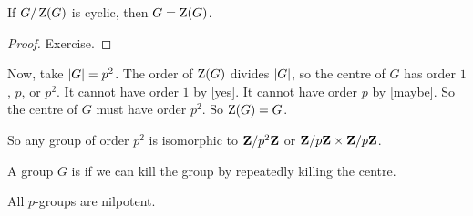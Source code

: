 \documentclass[11pt, oneside]{amsart}
\begin{document}
\begin{proposition}\label{maybe}
If $G/\operatorname{Z}(G)$ is cyclic, then $G=\operatorname{Z}(G)$.
\end{proposition}
\begin{proof}
Exercise.
\end{proof}

Now, take $\left \lvert G \right \rvert = p^2$. The order of $\operatorname{Z}(G)$ divides $\left \lvert G \right \rvert$, so the centre of $G$ has order $1$, $p$, or $p^2$. It cannot have order $1$ by \cref{yes}. It cannot have order $p$ by \cref{maybe}. So the centre of $G$ must have order $p^2$. So $\operatorname{Z}(G) = G$.

So any group of order $p^2$ is isomorphic to $\mathbf Z/p^2\mathbf Z$ or $\mathbf Z /p\mathbf Z\times \mathbf Z/p\mathbf Z$. 

\begin{definition}
A group $G$ is  if we can kill the group by repeatedly killing the centre.
\end{definition}

\begin{corollary}\label{nilp}
All $p$-groups are nilpotent.
\end{corollary}
\end{document}
